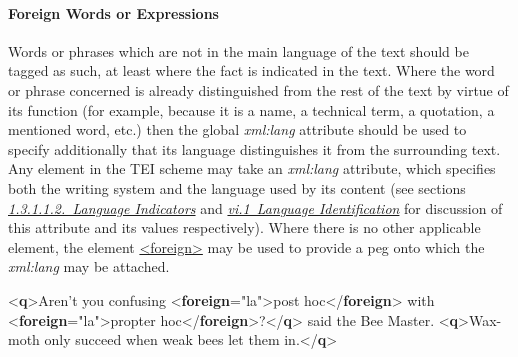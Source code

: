 \paragraph[{Foreign Words or Expressions}]{Foreign Words or Expressions}\label{COHQHF}\par
Words or phrases which are not in the main language of the text should be tagged as such, at least where the fact is indicated in the text. Where the word or phrase concerned is already distinguished from the rest of the text by virtue of its function (for example, because it is a name, a technical term, a quotation, a mentioned word, etc.) then the global {\itshape xml:lang} attribute should be used to specify additionally that its language distinguishes it from the surrounding text. Any element in the TEI scheme may take an {\itshape xml:lang} attribute, which specifies both the writing system and the language used by its content (see sections \textit{\hyperref[STGAla]{1.3.1.1.2.\ Language Indicators}} and \textit{\hyperref[CHSH]{vi.1\ Language Identification}} for discussion of this attribute and its values respectively). Where there is no other applicable element, the element \hyperref[TEI.foreign]{<foreign>} may be used to provide a peg onto which the {\itshape xml:lang} may be attached. \par\bgroup{}\exampleFont \begin{shaded}\noindent\mbox{}{<\textbf{q}>}Aren't you confusing {<\textbf{foreign}\hspace*{1em}{xml:lang}="{la}">}post hoc{</\textbf{foreign}>} with {<\textbf{foreign}\hspace*{1em}{xml:lang}="{la}">}propter\mbox{}\newline 
\hspace*{1em}\hspace*{1em} hoc{</\textbf{foreign}>}?{</\textbf{q}>} said the Bee Master. \mbox{}\newline 
{<\textbf{q}>}Wax-moth only succeed when\mbox{}\newline 
 weak bees let them in.{</\textbf{q}>}\end{shaded}\egroup\par \par
